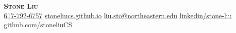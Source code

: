 \begin{center}
	\textbf{\Huge \scshape Stone Liu} \\ \vspace{4pt}
	\uline{617-792-6757} \quad
	\href{https://stoneliucs.github.io/}{\uline{stoneliucs.github.io}} \quad
	\href{mailto:liu.sto@northeastern.edu}{\uline{liu.sto@northeastern.edu}} \quad
	\href{http://linkedin.com/in/stone-liu}{\uline{linkedin/stone-liu}} \quad
	\href{https://github.com/stoneliuCS}{\uline{github.com/stoneliuCS}}
\end{center}

